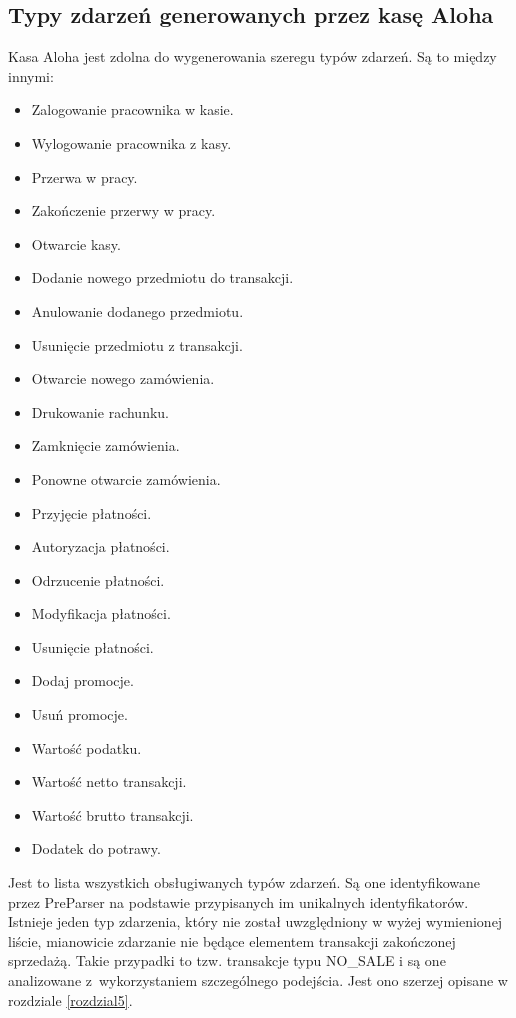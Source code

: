 \documentclass[a4paper]{book}
\begin{document}
\subsection{Typy zdarzeń generowanych przez kasę Aloha}
Kasa Aloha jest zdolna do wygenerowania szeregu typów zdarzeń. Są to między innymi:
\begin{itemize}
	\setlength\itemsep{0.1pt}
	\item Zalogowanie pracownika w kasie.
	\item Wylogowanie pracownika z kasy.
	\item Przerwa w pracy.
	\item Zakończenie przerwy w pracy.
	\item Otwarcie kasy.
	\item Dodanie nowego przedmiotu do transakcji.
	\item Anulowanie dodanego przedmiotu.
	\item Usunięcie przedmiotu z transakcji.
	\item Otwarcie nowego zamówienia.
	\item Drukowanie rachunku.
	\item Zamknięcie zamówienia.
	\item Ponowne otwarcie zamówienia.
	\item Przyjęcie płatności.
	\item Autoryzacja płatności.
	\item Odrzucenie płatności.
	\item Modyfikacja płatności.
	\item Usunięcie płatności.
	\item Dodaj promocje.
	\item Usuń promocje.
	\item Wartość podatku.
	\item Wartość netto transakcji.
	\item Wartość brutto transakcji.
	\item Dodatek do potrawy.
\end{itemize}
Jest to lista wszystkich obsługiwanych typów zdarzeń. Są one identyfikowane przez PreParser na podstawie przypisanych im unikalnych identyfikatorów. Istnieje  jeden typ zdarzenia, który nie został uwzględniony w wyżej wymienionej liście, mianowicie zdarzanie nie będące elementem transakcji zakończonej sprzedażą. Takie przypadki to tzw. transakcje typu NO\_SALE i są  one analizowane z~wykorzystaniem szczególnego podejścia. Jest ono szerzej opisane w rozdziale \ref{rozdzial5}.
\end{document}
